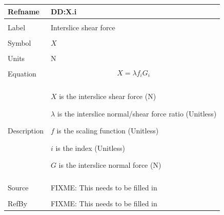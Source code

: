 \documentclass[12pt]{article}
\begin{document}
\noindent \begin{minipage}{\textwidth}
\begin{tabular}{p{} p{}}
\toprule \textbf{Refname} & \textbf{DD:X.i}
\label{DD:X.i}
\\ \midrule \\
Label & Interslice shear force
\\ \midrule \\
Symbol & $X$
\\ \midrule \\
Units & N
\\ \midrule \\
Equation & \begin{dmath}
           X=λ f_{i} G_{i}
           \end{dmath}
\\ \midrule \\
Description & \begin{symbDescription}
              \item{$X$ is the interslice shear force (N)}
              \item{$λ$ is the interslice normal/shear force ratio (Unitless)}
              \item{$f$ is the scaling function (Unitless)}
              \item{$i$ is the index (Unitless)}
              \item{$G$ is the interslice normal force (N)}
              \end{symbDescription}
\\ \midrule \\
Source & FIXME: This needs to be filled in
\\ \midrule \\
RefBy & FIXME: This needs to be filled in
\\ \bottomrule \end{tabular}
\end{minipage}\\
~\newline
\end{document}
